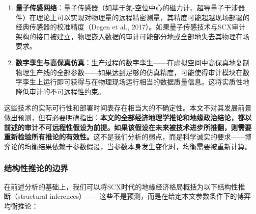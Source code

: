 \documentclass[12pt,a4paper]{ctexart}
\theoremstyle{definition}
\theoremstyle{remark}
\begin{document}
\begin{enumerate}[label=(\roman*)]
    \item \textbf{量子传感网络}：量子传感器（如基于氮-空位中心的磁力计、超导量子干涉器件）在理论上可以实现对物理量的远程精密测量，其精度可能超越现场部署的经典传感器的校准精度（Degen et al., 2017）。如果量子传感技术与SCX审计架构的接口被建立，物理嵌入数据的审计可能部分地或全部地失去其物理在场要求。
    \item \textbf{数字孪生与高保真仿真}：生产过程的数字孪生——在虚拟空间中高保真地复制物理生产线的全部参数——如果达到足够的仿真精度，可能使得审计模块在数字孪生上运行即可获得与在物理现场运行相当的数据质量信息。这将实质性地降低审计的不可远程性约束。
\end{enumerate}

这些技术的实际可行性和部署时间表存在相当大的不确定性。本文不对其发展前景做出预测，但有必要明确指出：\textbf{本文的全部经济地理学推论和地缘政治结论，都以前述的审计不可远程性假设为前提。如果该假设在未来被技术进步所推翻，则需要重新检验所有推论的有效性。}这不是我们分析的弱点，而是科学诚实的要求——博弈论的均衡结果依赖于参数假设，当参数本身发生变化时，均衡需要被重新计算。

\subsubsection*{结构性推论的边界}

在前述分析的基础上，我们可以将SCX时代的地缘经济格局概括为以下结构性推断（structural inferences）——这些不是预测，而是在给定本文参数条件下的博弈均衡推论：
\end{document}
